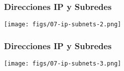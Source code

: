\documentclass[letter]{beamer}
\begin{document}
\begin{frame}
  \frametitle{Direcciones IP y Subredes}

  \begin{center}
    \texttt{[image: figs/07-ip-subnets-2.png]}
  \end{center}
  

\end{frame}
\begin{frame}
  \frametitle{Direcciones IP y Subredes}

  \begin{center}
    \texttt{[image: figs/07-ip-subnets-3.png]}
  \end{center}
  

\end{frame}
\end{document}
